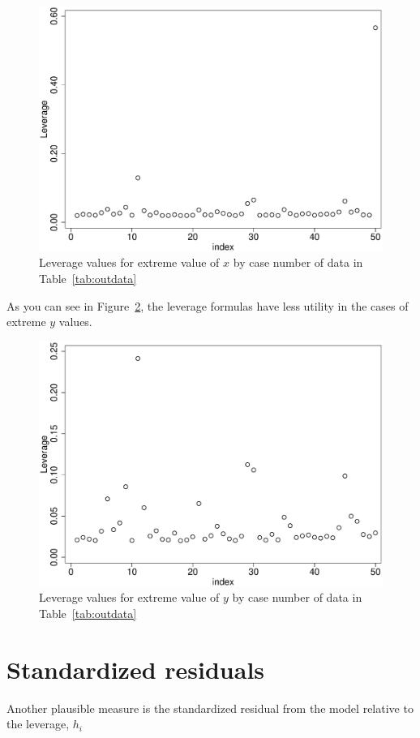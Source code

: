 \begin{figure}
   \centering
   \includegraphics[angle=0,
           width=.75\textwidth]{xout_hatvalues_index.eps}
   \caption{Leverage values for extreme value of $x$ by case number of data in Table~\ref{tab:outdata}}
  \label{fig:xlever}
\end{figure}

As you can see in Figure~\ref{fig:ylever}, the leverage formulas have less utility in the cases of extreme $y$ values.

\begin{figure}
   \centering
   \includegraphics[angle=0,
           width=.75\textwidth]{yout_hatvalues_index.eps}
   \caption{Leverage values for extreme value of $y$ by case number of data in Table~\ref{tab:outdata}}
  \label{fig:ylever}
\end{figure}

\section{Standardized residuals}

Another plausible measure is the standardized residual from the model relative to the leverage, $h_i$

